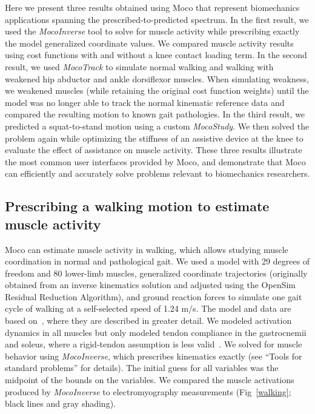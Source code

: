\documentclass[10pt,letterpaper]{article}
\begin{document}
Here we present three results obtained using Moco that represent biomechanics applications spanning the prescribed-to-predicted spectrum. In the first result, we used the \textit{MocoInverse} tool to solve for muscle activity while prescribing exactly the model generalized coordinate values. We compared muscle activity results using cost functions with and without a knee contact loading term. In the second result, we used \textit{MocoTrack} to simulate normal walking and walking with weakened hip abductor and ankle dorsiflexor muscles. When simulating weakness, we weakened muscles (while retaining the original cost function weights) until the model was no longer able to track the normal kinematic reference data and compared the resulting motion to known gait pathologies. In the third result, we predicted a squat-to-stand motion using a custom \textit{MocoStudy}. We then solved the problem again while optimizing the stiffness of an assistive device at the knee to evaluate the effect of assistance on muscle activity. These three results illustrate the most common user interfaces provided by Moco, and demonstrate that Moco can efficiently and accurately solve problems relevant to biomechanics researchers.

\subsection*{Prescribing a walking motion to estimate muscle activity}

Moco can estimate muscle activity in walking, which allows studying muscle coordination in normal and pathological gait. We used a model with 29 degrees of freedom and 80 lower-limb muscles, generalized coordinate trajectories (originally obtained from an inverse kinematics solution and adjusted using the OpenSim Residual Reduction Algorithm), and ground reaction forces to simulate one gait cycle of walking at a self-selected speed of 1.24 m/s. The model and data are based on~\cite{Rajagopal:2016ek}, where they are described in greater detail. We modeled activation dynamics in all muscles but only modeled tendon compliance in the gastrocnemii and soleus, where a rigid-tendon assumption is less valid~\cite{Groote:2016dq}. We solved for muscle behavior using \textit{MocoInverse}, which prescribes kinematics exactly (see ``Tools for standard problems'' for details). The initial guess for all variables was the midpoint of the bounds on the variables. We compared the muscle activations produced by \textit{MocoInverse} to electromyography measurements (Fig~\ref{walking}; black lines and gray shading).
\end{document}
